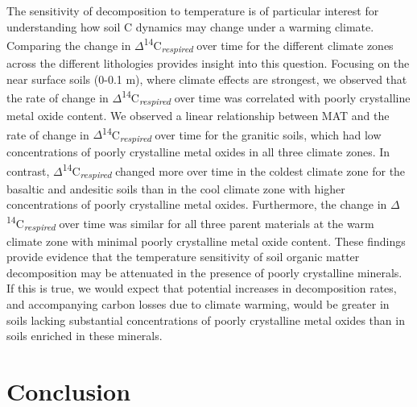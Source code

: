 \documentclass[english,man,floatsintext]{apa6}
\begin{document}
The sensitivity of decomposition to temperature is of particular interest for understanding how soil C dynamics may change under a warming climate. Comparing the change in \(\Delta\)\textsuperscript{14}C\textsubscript{\emph{respired}} over time for the different climate zones across the different lithologies provides insight into this question. Focusing on the near surface soils (0-0.1 m), where climate effects are strongest, we observed that the rate of change in \(\Delta\)\textsuperscript{14}C\textsubscript{\emph{respired}} over time was correlated with poorly crystalline metal oxide content. We observed a linear relationship between MAT and the rate of change in \(\Delta\)\textsuperscript{14}C\textsubscript{\emph{respired}} over time for the granitic soils, which had low concentrations of poorly crystalline metal oxides in all three climate zones. In contrast, \(\Delta\)\textsuperscript{14}C\textsubscript{\emph{respired}} changed more over time in the coldest climate zone for the basaltic and andesitic soils than in the cool climate zone with higher concentrations of poorly crystalline metal oxides. Furthermore, the change in \(\Delta\)\textsuperscript{14}C\textsubscript{\emph{respired}} over time was similar for all three parent materials at the warm climate zone with minimal poorly crystalline metal oxide content. These findings provide evidence that the temperature sensitivity of soil organic matter decomposition may be attenuated in the presence of poorly crystalline minerals. If this is true, we would expect that potential increases in decomposition rates, and accompanying carbon losses due to climate warming, would be greater in soils lacking substantial concentrations of poorly crystalline metal oxides than in soils enriched in these minerals.

\hypertarget{conclusion}{%
\section{Conclusion}\label{conclusion}}
\end{document}
